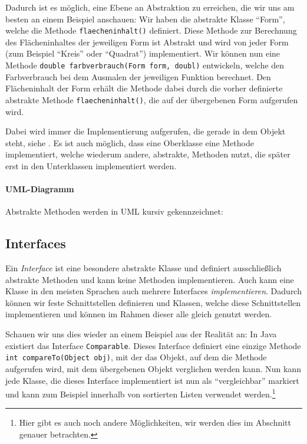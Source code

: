 	Dadurch ist es möglich, eine Ebene an Abstraktion zu erreichen, die wir uns am besten an einem Beispiel anschauen: Wir haben die abstrakte Klasse \enquote{Form}, welche die Methode \texttt{flaecheninhalt()} definiert. Diese Methode zur Berechnung des Flächeninhaltes der jeweiligen Form ist Abstrakt und wird von jeder Form (zum Beispiel \enquote{Kreis} oder \enquote{Quadrat}) implementiert. Wir können nun eine Methode \lstinline|double farbverbrauch(Form form, doubl)| entwickeln, welche den Farbverbrauch bei dem Ausmalen der jeweiligen Funktion berechnet. Den Flächeninhalt der Form erhält die Methode dabei durch die vorher definierte abstrakte Methode \texttt{flaecheninhalt()}, die auf der übergebenen Form aufgerufen wird.
	
	Dabei wird immer die Implementierung aufgerufen, die gerade in dem Objekt steht, siehe . Es ist auch möglich, dass eine Oberklasse eine Methode implementiert, welche wiederum andere, abstrakte, Methoden nutzt, die später erst in den Unterklassen implementiert werden.
	
	\paragraph{UML-Diagramm}
		Abstrakte Methoden werden in UML kursiv gekennzeichnet:
		\begin{figure}[H]
			\centering
		\end{figure}

\subsection{Interfaces} \imperativeMark \oopMark

	Ein \textit{Interface} ist eine besondere abstrakte Klasse und definiert ausschließlich abstrakte Methoden und kann keine Methoden implementieren. Auch kann eine Klasse in den meisten Sprachen auch mehrere Interfaces \textit{implementieren}. Dadurch können wir feste Schnittstellen definieren und Klassen, welche diese Schnittstellen implementieren und können im Rahmen dieser alle gleich genutzt werden.
	
	Schauen wir uns dies wieder an einem Beispiel aus der Realität an: In Java existiert das Interface \lstinline|Comparable|. Dieses Interface definiert eine einzige Methode \lstinline|int compareTo(Object obj)|, mit der das Objekt, auf dem die Methode aufgerufen wird, mit dem übergebenen Objekt verglichen werden kann. Nun kann jede Klasse, die dieses Interface implementiert ist nun als \enquote{vergleichbar} markiert und kann zum Beispiel innerhalb von sortierten Listen verwendet werden.\footnote{Hier gibt es auch noch andere Möglichkeiten, wir werden dies im Abschnitt  genauer betrachten.}
	
